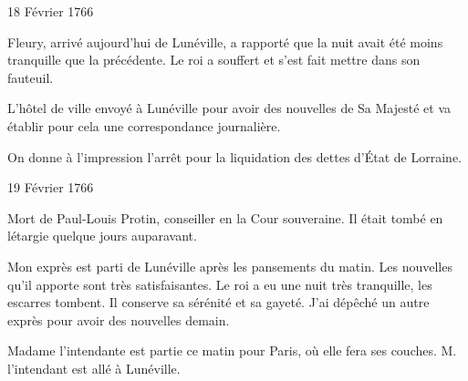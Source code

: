                      \begin{diary}{18 Février 1766}{}
                        
                        
                           Fleury, arrivé aujourd'hui de
                              Lunéville,
                           a rapporté que la nuit avait été moins
                           tranquille que la précédente. Le
                              roi a souffert
                           et s'est fait mettre dans son fauteuil. \bigskip
        
        
                        
                           L'hôtel de ville envoyé à Lunéville pour avoir
                           des nouvelles de Sa Majesté et va établir pour
                           cela une correspondance journalière. \bigskip
        
        
                         On donne à l'impression l'arrêt pour la
                           liquidation des dettes d’État de Lorraine. \bigskip
        
        
                     \end{diary}

                     \begin{diary}{19 Février 1766}{}
                        
                         Mort de Paul-Louis Protin, conseiller en la
                              Cour souveraine. Il était tombé en létargie
                           quelque jours auparavant. \bigskip
        
        
                         Mon exprès est parti de Lunéville après
                           les pansements du matin. Les nouvelles qu'il apporte sont très satisfaisantes. Le
                              roi a
                           eu une nuit très tranquille, les escarres
                           tombent. Il conserve sa sérénité et sa
                           gayeté. J'ai dépêché un autre exprès
                           pour avoir des nouvelles demain. \bigskip
        
        
                        
                           Madame l'intendante est partie ce matin
                           pour Paris, où elle fera ses
                           couches. M.
                              l'intendant est allé à Lunéville. \bigskip
        
        
                     \end{diary}

